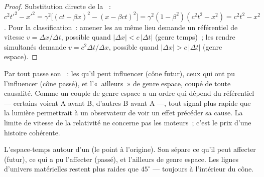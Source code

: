 \begin{proof}
Substitution directe de la ~:
$c^2t'^2 - x'^2 = \gamma^2\big[(ct - \beta x)^2 - (x - \beta ct)^2
\big] = \gamma^2(1 - \beta^2)(c^2t^2 - x^2) = c^2t^2 - x^2$.
Pour la classification~: amener les  au même lieu demande un
référentiel de vitesse $v = \Delta x/\Delta t$, possible quand $|\Delta x| <
c\,|\Delta t|$ (genre temps)~; les rendre simultanés demande $v =
c^2\Delta t/\Delta x$, possible quand $|\Delta x| > c\,|\Delta t|$
(genre espace).
\end{proof}

\begin{remark}\label{rem:b3:relativistic-kinematics:causality}
Par tout  passe son \emph{}~: les 
qu'il peut influencer (cône futur), ceux qui ont pu l'influencer (cône
passé), et l'«~ailleurs~» de genre espace, coupé de toute causalité.
Comme un couple de genre espace a un ordre qui dépend du référentiel
--- certains voient A avant B, d'autres B avant A ---, tout signal plus
rapide que la lumière permettrait à un observateur de voir un effet
précéder sa cause. La limite de vitesse de la relativité ne concerne
pas les moteurs~; c'est le prix d'une histoire cohérente.
\end{remark}

\begin{omfigure}

{\small L'espace-temps autour d'un  (le point à l'origine).
Son  sépare ce qu'il peut affecter (futur), ce qui a pu
l'affecter (passé), et l'ailleurs de genre espace. Les lignes d'univers
matérielles restent plus raides que $45^\circ$ --- toujours à
l'intérieur du cône.}
\end{omfigure}

